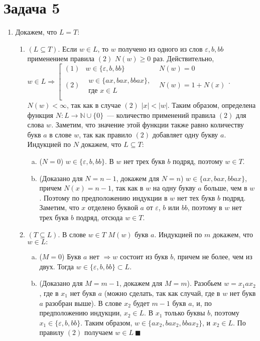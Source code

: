 \documentclass[a4paper]{article}
\begin{document}
\section*{Задача 5}
\begin{enumerate}[1.]
\item
Докажем, что $L=T$:
\begin{enumerate}[1.]
\item $(L\subseteq T)$. Если $w\in L$, то $w$ получено из одного из слов $\varepsilon,b,bb$ применением правила $(2)$ $N(w)\geqslant 0$ раз. Действительно, $w\in L\Rightarrow
\left[
\begin{array}{lll}
(1) & w\in\{\varepsilon,b,bb\} & N(w)=0\\
(2) & \substack{w\in\{ax,bax,bbax\},\\\text{где } x\in L} & N(w)=1+N(x)\\
\end{array}
\right.
$. $N(w)<\infty$, так как в случае $(2)$ $|x|<|w|$.\newline
Таким образом, определена функция $N:L\longrightarrow \mathbb N\cup\{0\}$~--- количество применений правила $(2)$ для слова $w$. Заметим, что значение этой функции также равно количеству букв $a$ в слове $w$, так как правило $(2)$ добавляет одну букву $a$. Индукцией по $N$ докажем, что $L\subseteq T$:
\begin{enumerate}[a.]
\item ($N=0$) $w\in \{\varepsilon,b,bb\}$. В $w$ нет трех букв $b$ подряд, поэтому $w\in T$.
\item (Доказано для $N=n-1$, докажем для $N=n$) $w\in \{ax,bax,bbax\}$, причем $N(x)=n-1$, так как в $w$ на одну букву $a$ больше, чем в $w$. Поэтому по предположению индукции в $w$ нет тех букв $b$ подряд. Заметим, что $x$ отделено буквой $a$ от $\varepsilon$, $b$ или $bb$, поэтому в $w$ нет трех букв $b$ подряд, отсюда $w\in T$.
\end{enumerate}
\item $(T\subseteq L)$. В слове $w\in T$ $M(w)$ букв $a$. Индукцией по $m$ докажем, что $w\in L:$
\begin{enumerate}[a.]
\item ($M=0$) Букв $a$ нет $\Rightarrow w$ состоит из букв $b$, причем не более, чем из двух. Тогда $w\in \{\varepsilon,b,bb\}\subset L$.
\item (Доказано для $M=m-1$, докажем для $M=m$). Разобьем $w=x_1ax_2$, где в $x_1$ нет букв $a$ (можно сделать, так как случай, где в $w$ нет букв $a$ разобран выше). В слове $x_2$ будет $m-1$ букв $a$, и, по предположению индукции, $x_2\in L$. В $x_1$ только буквы $b$, поэтому $x_1\in\{\varepsilon,b,bb\}$. Таким образом, $w\in\{ax_2,bax_2,bbax_2\}$, и $x_2\in L$. По правилу $(2)$ получаем $w\in L~\blacksquare$

\end{enumerate}
\end{enumerate}
\end{enumerate}
\end{document}
